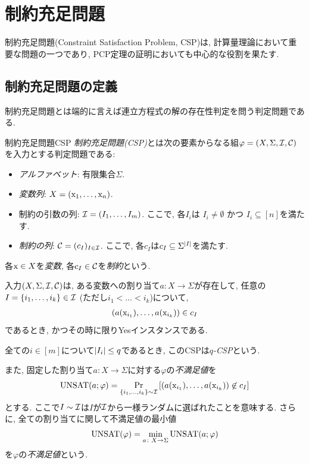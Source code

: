\chapter{制約充足問題} \label{chap:CSP}
制約充足問題(Constraint Satisfaction Problem, CSP)は, 計算量理論において重要な問題の一つであり, PCP定理の証明においても中心的な役割を果たす.

\section{制約充足問題の定義}
制約充足問題とは端的に言えば連立方程式の解の存在性判定を問う判定問題である.

\begin{definition}{制約充足問題}{CSP}
\emph{制約充足問題(CSP)}とは次の要素からなる組$\varphi = (X,\Sigma,\mathcal{I},\mathcal{C})$を入力とする判定問題である:
\begin{itemize}
  \item \emph{アルファベット}: 有限集合$\Sigma$.
  \item \emph{変数列}: $X=(\mathrm{x}_1,\dots,\mathrm{x}_n)$.
  \item 制約の引数の列: $\mathcal{I}=(I_1,\dots,I_m)$. ここで, 各$I_i$は $I_i\ne\emptyset$ かつ $I_i\subseteq [n]$を満たす.
  \item \emph{制約の列}: $\mathcal{C}=(c_I)_{I\in\mathcal{I}}$. ここで, 各$c_I$は$c_I \subseteq \Sigma^{\abs{I}}$を満たす.
\end{itemize}
各$\mathrm{x}\in X$を\emph{変数}, 各$c_I\in\mathcal{C}$を\emph{制約}という.

入力$(X,\Sigma,\mathcal{I},\mathcal{C})$は,
ある変数への割り当て$a \colon X \to \Sigma$が存在して, 任意の$I=\{i_1,\dots,i_k\}\in\mathcal{I}$ (ただし$i_1<\dots<i_k$)について,
\begin{align*}
  (a(\mathrm{x}_{i_1}),\dots,a(\mathrm{x}_{i_k})) \in c_I
\end{align*}
であるとき, かつその時に限りYesインスタンスである.

全ての$i\in[m]$について$\abs{I_i}\le q$であるとき, このCSPは\emph{$q$-CSP}という.

また, 固定した割り当て$a \colon X\to \Sigma$に対する$\varphi$の\emph{不満足値}を
\begin{align*}
  \mathrm{UNSAT}(a;\varphi) = \Pr_{\qty{i_1,\dots,i_k}\sim\mathcal{I}}\qty[(a(\mathrm{x}_{i_1}),\dots,a(\mathrm{x}_{i_k})) \not\in c_I]
\end{align*}
とする. ここで$I\sim\mathcal{I}$は$I$が$\mathcal{I}$から一様ランダムに選ばれたことを意味する.
さらに, 全ての割り当てに関して不満足値の最小値
\begin{align*}
  \mathrm{UNSAT}(\varphi) = \min_{a\colon X\to\Sigma} \mathrm{UNSAT}(a;\varphi)
\end{align*}
を$\varphi$の\emph{不満足値}という.
\end{definition}

